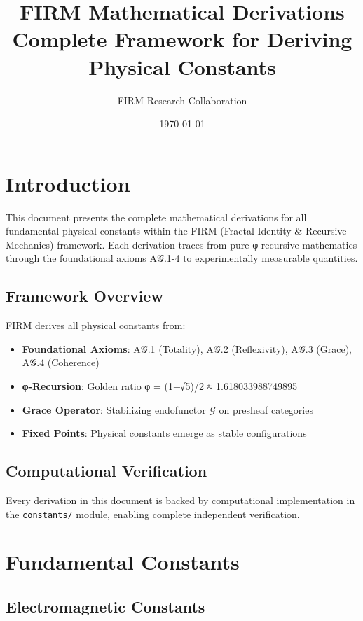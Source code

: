 \documentclass[11pt,a4paper]{article}
\title{\textbf{FIRM Mathematical Derivations}\\
       \large Complete Framework for Deriving Physical Constants}
\author{FIRM Research Collaboration}
\date{\today}
\newcommand{\G}{\mathcal{G}}                %
\begin{document}
\maketitle

\tableofcontents
\newpage

\section{Introduction}

This document presents the complete mathematical derivations for all fundamental physical constants within the FIRM (Fractal Identity \& Recursive Mechanics) framework. Each derivation traces from pure φ-recursive mathematics through the foundational axioms A𝒢.1-4 to experimentally measurable quantities.

\subsection{Framework Overview}

FIRM derives all physical constants from:
\begin{itemize}
\item \textbf{Foundational Axioms}: A𝒢.1 (Totality), A𝒢.2 (Reflexivity), A𝒢.3 (Grace), A𝒢.4 (Coherence)
\item \textbf{φ-Recursion}: Golden ratio φ = (1+√5)/2 ≈ 1.618033988749895
\item \textbf{Grace Operator}: Stabilizing endofunctor $\G$ on presheaf categories
\item \textbf{Fixed Points}: Physical constants emerge as stable configurations
\end{itemize}

\subsection{Computational Verification}

Every derivation in this document is backed by computational implementation in the \texttt{constants/} module, enabling complete independent verification.

\section{Fundamental Constants}

\subsection{Electromagnetic Constants}


\end{document}
